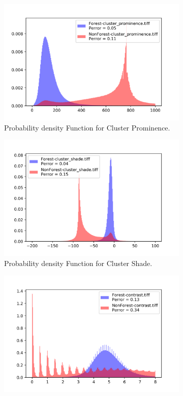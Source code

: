 \begin{figure}[H]
  \centering
  \begin{subfigure}[b]{0.4\linewidth}
    \includegraphics[width=\linewidth]{Chapter4/sum_and_diff_textures/cluster_prominence_hist.png}
     \caption{Probability density Function for Cluster Prominence.}
  \end{subfigure}
  \centering
  \begin{subfigure}[b]{0.4\linewidth}
    \includegraphics[width=\linewidth]{Chapter4/sum_and_diff_textures/cluster_shade_hist.png}
     \caption{Probability density Function for Cluster Shade.}
  \end{subfigure}
  \centering
  \begin{subfigure}[b]{0.4\linewidth}
    \includegraphics[width=\linewidth]{Chapter4/sum_and_diff_textures/contrast_hist.png}

\end{subfigure}
\end{figure}
